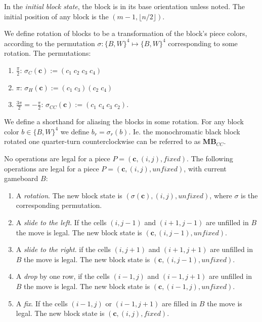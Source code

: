 \begin{description}[style=unboxed, leftmargin=0cm,labelsep=1em]
    In the \textit{initial block state}, the block is in its base orientation unless noted. The initial position of any block is the $(m-1, \lfloor n/2 \rfloor)$.

    \item[Rotating blocks] We define rotation of blocks to be a transformation of the block's piece colors, according to the permutation $\sigma: \{B,W\}^4 \mapsto \{B,W\}^4$ corresponding to some rotation. The permutations:

    \begin{enumerate}
        \item $\frac{\pi}{2}$: $\sigma_{C}(\mathbf{c}) := (c_1\;c_2\;c_3\;c_4)$
        \item $\pi$: $\sigma_{H}(\mathbf{c}) := (c_1\;c_3)(c_2\;c_4)$
        \item $\frac{3 \pi}{2} = -\frac{\pi}{2}$: $\sigma_{CC}(\mathbf{c}) := (c_1\;c_4\;c_3\;c_2)$.
    \end{enumerate}

    We define a shorthand for aliasing the blocks in some rotation. For any block color $b \in \{B, W\}^4$ we define $b_{r} = \sigma_{r}(b)$. Ie. the monochromatic black block rotated one quarter-turn counterclockwise can be referred to as $\mathbf{MB}_{CC}$.

    \item[Game operations] No operations are legal for a piece $P = (\mathbf{c}, (i,j), fixed)$. The following operations are legal for a piece $P = (\mathbf{c}, (i,j), unfixed)$, with current gameboard $B$:

    \begin{enumerate}
        \item A \emph{rotation}. The new block state is $(\sigma(\mathbf{c}), (i,j), unfixed)$, where $\sigma$ is the corresponding permutation.
        \item A \emph{slide to the left}. If the cells $(i,j-1)$ and $(i+1, j-1)$ are unfilled in $B$ the move is legal. The new block state is $(\mathbf{c}, (i, j-1), unfixed)$.
        \item A \emph{slide to the right}. if the cells $(i,j+1)$ and $(i+1, j+1)$ are unfilled in $B$ the move is legal. The new block state is $(\mathbf{c}, (i, j-1), unfixed)$.
        \item A \emph{drop} by one row, if the cells $(i-1, j)$ and $(i-1, j+1)$ are unfilled in $B$ the move is legal. The new block state is $(\mathbf{c}, (i-1, j), unfixed)$.
        \item A \emph{fix}. If the cells $(i-1, j)$ or $(i-1, j+1)$ are filled in $B$ the move is legal. The new block state is $(\mathbf{c}, (i, j), fixed)$.
    \end{enumerate}


\end{description}
